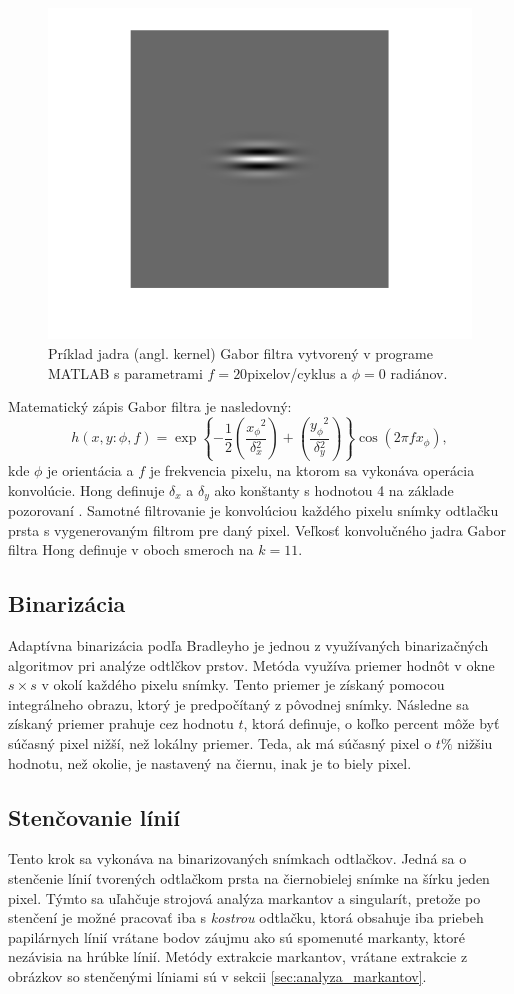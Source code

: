   \begin{figure}[h]
    \centering
    \includegraphics[width=0.25\linewidth]{obrazky-figures/gabor_kernel.png}
    \caption{Príklad jadra (angl. kernel) Gabor filtra vytvorený v programe MATLAB s parametrami $f = 20$pixelov/cyklus a $\phi{} = 0$ radiánov.}
    \label{obr:gabor_kernel}
  \end{figure}
  Matematický zápis Gabor filtra je nasledovný:
  \begin{equation}
    h(x,y: \phi{}, f) = \exp{\left\{ -\frac{1}{2} \left( \frac{x_\phi{}^2}{\delta{}_x^2} \right) + \left( \frac{y_\phi{}^2}{\delta{}_y^2} \right) \right\}} \cos{}\left(2\pi{}fx_\phi{}\right),
  \end{equation}
  kde $\phi{}$ je orientácia a $f$ je frekvencia pixelu, na ktorom sa vykonáva operácia konvolúcie. Hong definuje $\delta{}_x$ a $\delta{}_y$
  ako konštanty s hodnotou 4 na základe pozorovaní \cite{Hong}. Samotné filtrovanie je konvolúciou každého pixelu snímky odtlačku prsta s vygenerovaným filtrom
  pre daný pixel. Veľkosť konvolučného jadra Gabor filtra Hong definuje v oboch smeroch na $k = 11$.

  \subsection{Binarizácia}
  Adaptívna binarizácia podľa Bradleyho \cite{bradley2007adaptive} je jednou z využívaných binarizačných algoritmov pri analýze odtlčkov prstov.
  Metóda využíva priemer hodnôt v okne $s \times s$ v okolí každého pixelu snímky. Tento priemer je získaný pomocou integrálneho obrazu, ktorý je predpočítaný
  z pôvodnej snímky. Následne sa získaný priemer prahuje cez hodnotu $t$, ktorá definuje, o koľko percent môže byť súčasný pixel nižší, než lokálny priemer.
  Teda, ak má súčasný pixel o $t\%$ nižšiu hodnotu, než okolie, je nastavený na čiernu, inak je to biely pixel.

  \subsection{Stenčovanie línií}
  Tento krok sa vykonáva na binarizovaných snímkach odtlačkov. Jedná sa o stenčenie línií tvorených odtlačkom prsta na čiernobielej snímke na šírku
  jeden pixel. Týmto sa uľahčuje strojová analýza markantov a singularít, pretože po stenčení je možné pracovať iba s \emph{kostrou} odtlačku,
  ktorá obsahuje iba priebeh papilárnych línií vrátane bodov záujmu ako sú spomenuté markanty, ktoré nezávisia na hrúbke línií.
  Metódy extrakcie markantov, vrátane extrakcie z obrázkov so stenčenými líniami sú v sekcii \ref{sec:analyza_markantov}.
  
